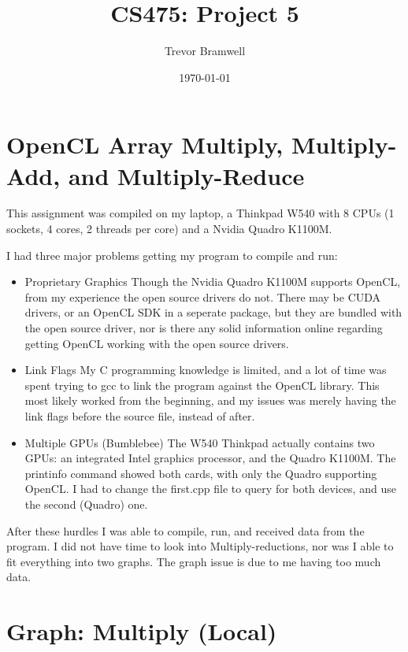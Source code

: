 \documentclass[12pt]{article}
\title{CS475: Project 5}
\author{Trevor Bramwell}
\date{\today}
\begin{document}
\maketitle

\section*{OpenCL Array Multiply, Multiply-Add, and Multiply-Reduce}

This assignment was compiled on my laptop, a Thinkpad W540 with 8 CPUs
(1 sockets, 4 cores, 2 threads per core) and a Nvidia Quadro K1100M.

I had three major problems getting my program to compile and run:
\begin{itemize}
    \item Proprietary Graphics
        Though the Nvidia Quadro K1100M supports OpenCL, from my
        experience the open source drivers do not. There may be CUDA
        drivers, or an OpenCL SDK in a seperate package, but they are
        bundled with the open source driver, nor is there any solid
        information online regarding getting OpenCL working with the
        open source drivers.
    \item Link Flags
        My C programming knowledge is limited, and a lot of time was
        spent trying to gcc to link the program against the OpenCL
        library. This most likely worked from the beginning, and my
        issues was merely having the link flags before the source file,
        instead of after.
    \item Multiple GPUs (Bumblebee)
        The W540 Thinkpad actually contains two GPUs: an integrated
        Intel graphics processor, and the Quadro K1100M. The printinfo
        command showed both cards, with only the Quadro supporting
        OpenCL. I had to change the first.cpp file to query for both
        devices, and use the second (Quadro) one.
\end{itemize}

After these hurdles I was able to compile, run, and received data from
the program. I did not have time to look into Multiply-reductions, nor
was I able to fit everything into two graphs. The graph issue is due to
me having too much data.

\section*{Graph: Multiply (Local)}
\end{document}

